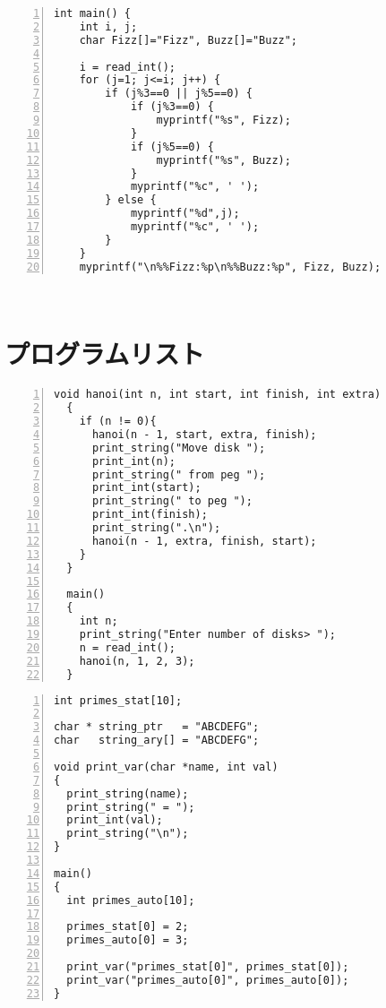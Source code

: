 \documentclass[11pt]{jarticle}
\begin{document}
\begin{lstlisting}[caption=FizzBuzz,label=FizzBuzz,numbers=left]
  int main() {
    int i, j;
    char Fizz[]="Fizz", Buzz[]="Buzz";

    i = read_int();
    for (j=1; j<=i; j++) {
        if (j%3==0 || j%5==0) {
            if (j%3==0) {
                myprintf("%s", Fizz);
            }
            if (j%5==0) {
                myprintf("%s", Buzz);
            }
            myprintf("%c", ' ');
        } else {
            myprintf("%d",j);
            myprintf("%c", ' ');
        }
    }
    myprintf("\n%%Fizz:%p\n%%Buzz:%p", Fizz, Buzz);
\end{lstlisting}

\begin{lstlisting}[caption=出力結果,label=output]
  
\end{lstlisting}

\section{プログラムリスト} \label{sec:program}

\begin{lstlisting}[caption=hanoi.c,label=hanoi,numbers=left]
  void hanoi(int n, int start, int finish, int extra)
  {
    if (n != 0){
      hanoi(n - 1, start, extra, finish);
      print_string("Move disk ");
      print_int(n);
      print_string(" from peg ");
      print_int(start);
      print_string(" to peg ");
      print_int(finish);
      print_string(".\n");
      hanoi(n - 1, extra, finish, start);
    }
  }
  
  main()
  {
    int n;
    print_string("Enter number of disks> ");
    n = read_int();
    hanoi(n, 1, 2, 3);
  }
\end{lstlisting}


\begin{lstlisting}[caption=report2-1.c,label=report2-1,numbers=left]
int primes_stat[10];

char * string_ptr   = "ABCDEFG";
char   string_ary[] = "ABCDEFG";

void print_var(char *name, int val)
{
  print_string(name);
  print_string(" = ");
  print_int(val);
  print_string("\n");
}

main()
{
  int primes_auto[10];

  primes_stat[0] = 2;
  primes_auto[0] = 3;

  print_var("primes_stat[0]", primes_stat[0]);
  print_var("primes_auto[0]", primes_auto[0]);
}
\end{lstlisting}
\end{document}
